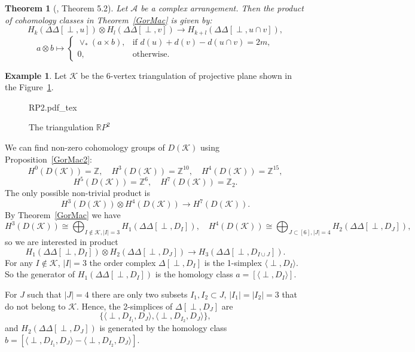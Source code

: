 \documentclass[a4paper,12pt]{amsart}
\newcommand{\incfig}[1]{%
	\def\svgscale{1}
	{#1.pdf_tex}
}
\newcommand{\DD}{\Delta\!\!\!\Delta}
\newcommand{\K}{\mathcal K}
\newcommand{\RR}{\mathbb R}
\newcommand{\ZZ}{\mathbb Z}
\newtheorem{theorem}[formula]{Theorem}
\theoremstyle{definition}
\newtheorem{example}[formula]{Example}
\theoremstyle{remark}
\numberwithin{equation}{section}
\begin{document}
\begin{theorem}[\cite{dLS}, Theorem 5.2]\label{product}
	Let $\mathcal{A}$ be a complex arrangement. Then the product of cohomology classes in Theorem~\ref{GorMac} is given by:
	$$H_k(\DD[\perp, u]) \otimes H_l(\DD[\perp, v]) \to H_{k+l}(\DD[\perp, u \cap v]),$$
	\begin{equation*}
		a \otimes b \mapsto
		\begin{cases} 
   \vee_*(a \times b), &\text{if } d(u) + d(v) - d(u \cap v) = 2m,\\
			0, &\text{otherwise}.
		\end{cases}
	\end{equation*}
\end{theorem}
\begin{example}\label{D-RP2}
	Let $\K$ be the 6-vertex triangulation of projective plane shown in the Figure~\ref{fig:RP2}.
	\begin{figure}[ht]
		\centering
		\incfig{RP2}
		\caption{The triangulation $\RR P^2$}
		\label{fig:RP2}
	\end{figure}
	We can find non-zero cohomology groups of $D(\K)$ using Proposition~\ref{GorMac2}:
	$$
		H^0(D(\K)) = \ZZ, \quad H^3(D(\K)) = \ZZ^{10},\quad H^4(D(\K)) = \ZZ^{15},$$
		$$H^5(D(\K)) = \ZZ^{6},\quad H^7(D(\K)) = \ZZ_2.
	$$
	The only possible non-trivial product is 
	$$H^3(D(\K)) \otimes H^4(D(\K)) \to H^7(D(\K)).$$
	By Theorem~\ref{GorMac} we have
	$$H^3(D(\K)) \cong \bigoplus_{I \notin \K, |I| = 3} H_1(\DD[\perp, D_I]), \quad H^4(D(\K)) \cong \bigoplus_{J \subset [6], |J| = 4} H_2(\DD[\perp, D_J]),$$
    so we are interested in product 
    \begin{equation}\label{product1}
        H_1(\DD[\perp, D_I]) \otimes H_2(\DD[\perp, D_J]) \to 
        H_3(\DD[\perp, D_{I \cup J}]).
    \end{equation}
	For any $I \notin \K$, $|I| = 3$ the order complex $\Delta[\perp, D_I]$
	is the 1-simplex $\langle \perp, D_I \rangle$.
	So the generator of 
	$H_1(\DD[\perp, D_I])$ is the homology class
	$a = [\langle \perp, D_I \rangle]$.
	
	For $J$ such that $|J| = 4$ there are only two subsets $I_1, I_2 \subset J$, $|I_1| = |I_2| = 3$ that do not belong to $\K$.
	Hence, the 2-simplices of $\Delta[\perp, D_J]$ are
	$$\{\langle \perp, D_{I_1}, D_J \rangle, \langle \perp, D_{I_2}, D_J \rangle \},$$
	and $H_2(\DD[\perp, D_J])$ is generated by the homology class
	$b = [\langle \perp, D_{I_1}, D_J \rangle - \langle \perp, D_{I_2}, D_J \rangle ]$.


\end{example}
\end{document}
